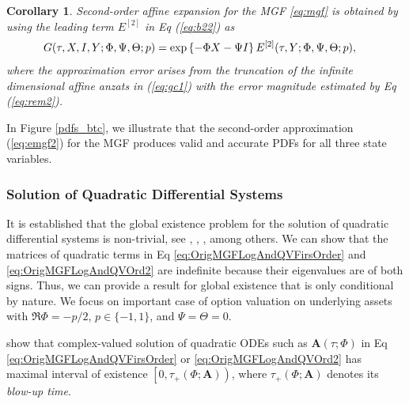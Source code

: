 \documentclass[pdftex,11pt,a4paper] {article}
\newtheorem{corollary}{Corollary}[section]
\begin{document}
\begin{corollary} \label {pr:emgf2} Second-order affine expansion for the MGF \eqref{eq:mgf} is obtained by using the leading term $E^{[2]}$ in Eq (\ref{eq:b22}) as
\begin{equation}\label{eq:emgf2}
\begin{split}
& G(\tau,X,I,Y; \Phi,\Psi,\Theta;p) =  \exp \left\{-\Phi X-\Psi I \right\} E^{[2]}(\tau,Y; \Phi,\Psi,\Theta;p),\vspace*{-1.0\baselineskip}
\end{split}
\end{equation}
where the approximation error arises from the truncation of the infinite dimensional affine anzats in (\ref{eq:gc1}) with the error magnitude estimated by Eq (\ref{eq:rem2}).
\end{corollary}

In Figure \ref{pdfs_btc}, we illustrate that the second-order approximation (\ref{eq:emgf2}) for the MGF produces valid and accurate PDFs for all three state variables.





\subsubsection{Solution of Quadratic Differential Systems}\label{sec:sol}


It is established that the global existence problem for the solution of quadratic differential systems is non-trivial, see \cite{Coppel1966}, \cite{Perko1970}, \cite{Jacobson1977}, \cite{Baris2008} among others. We can show that the matrices of quadratic terms in Eq \eqref{eq:OrigMGFLogAndQVFirsOrder} and \eqref{eq:OrigMGFLogAndQVOrd2} are indefinite because their eigenvalues are of both signs. Thus, we can provide a result for global existence that is only conditional by nature. We focus on important case of option valuation on underlying assets with $\Re \Phi=-p/2$, $p\in\{-1,1\}$, and $\Psi=\Theta=0$.

\cite{Perko1970} show that complex-valued solution of quadratic ODEs such as $\mathbf{A}(\tau;\Phi)$ in Eq \eqref{eq:OrigMGFLogAndQVFirsOrder} or \eqref{eq:OrigMGFLogAndQVOrd2} has maximal interval of existence $\left[0,\tau_+(\Phi;\mathbf{A})\right)$, where $\tau_+(\Phi;\mathbf{A})$ denotes its {\it blow-up time}.
\end{document}
